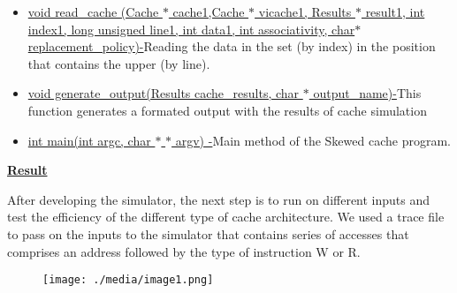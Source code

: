 \documentclass[12pt]{article}
\begin{document}
\begin{itemize}
	\item \uline{void read\_cache (Cache $\ast$ cache1,Cache $\ast$ vicache1, Results $\ast$ result1, int index1, long unsigned line1, int data1, int associativity, char$\ast$  replacement\_policy)-}Reading the data in the set (by index) in the position that contains the upper (by line).\par

	\item \uline{void generate\_output(Results cache\_results, char $\ast$ output\_name)-}This function generates a formated output with the results of cache simulation\par

	\item \uline{int main(int argc, char $\ast$ $\ast$ argv) -}Main method of the Skewed cache program. 
\end{itemize}\par

\setlength{\parskip}{8.04pt}



\newpage

\vspace{\baselineskip}
\vspace{\baselineskip}
\setlength{\parskip}{0.0pt}
\setlength{\parskip}{8.04pt}
{\fontsize{22pt}{26.4pt}\selectfont \textbf{\uline{Result}}\par}\par

{\fontsize{14pt}{16.8pt}\selectfont After developing the simulator, the next step is to run on different inputs and test the efficiency of the different type of cache architecture. We used a trace file to pass on the inputs to the simulator that contains series of accesses that comprises an address followed by the type of instruction W or R.\par}\par




\begin{figure}[H]
	\begin{Center}
		\texttt{[image: ./media/image1.png]}
	\end{Center}
\end{figure}


\end{document}
